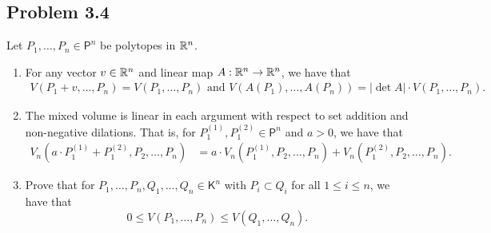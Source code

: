 \documentclass[12pt]{article}
\begin{document}
\newpage 

\subsection{Problem 3.4}

\begin{problem}
	Let $P_1, \ldots, P_n \in \mathsf{P}^n$ be polytopes in $\mathbb{R}^n$. 
    \begin{enumerate}[label = (\alph*)]
        \item For any vector $v \in \mathbb{R}^n$ and linear map $A : \mathbb{R}^n \to \mathbb{R}^n$, we have that  
        \begin{align*}
            V(P_1 + v, \ldots, P_n) = V(P_1, \ldots, P_n) \text{ and } V(A(P_1), \ldots, A(P_n)) = |\det A| \cdot V(P_1, \ldots, P_n).
        \end{align*}
        
        \item The mixed volume is linear in each argument with respect to set addition and non-negative dilations. That is, for $P_1^{(1)}, P_1^{(2)} \in \mathsf{P}^n$ and $a > 0$, we have that 
        \begin{align*}
            V_n(a \cdot P_1^{(1)} + P_1^{(2)}, P_2, \ldots, P_n) & = a \cdot V_n(P_1^{(1)}, P_2, \ldots, P_n) + V_n(P_1^{(2)}, P_2, \ldots, P_n).
        \end{align*}

        \item Prove that for $P_1, \ldots, P_n, Q_1, \ldots, Q_n \in \mathsf{K}^n$ with $P_i \subset Q_i$ for all $1 \leq i \leq n$, we have that 
        \[
            0 \leq V(P_1, \ldots, P_n) \leq V(Q_1, \ldots, Q_n).
        \]
    \end{enumerate}
\end{problem}
\end{document}
